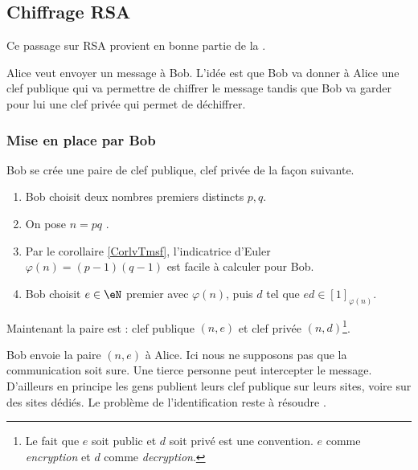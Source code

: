 \subsection{Chiffrage RSA}
\label{subSecEVaFYi}

Ce passage sur RSA provient en bonne partie de la .

Alice veut envoyer un message à Bob. L'idée est que Bob va donner à Alice une clef publique qui va permettre de chiffrer le message tandis que Bob va garder pour lui une clef privée qui permet de déchiffrer.

\subsubsection{Mise en place par Bob}

Bob se crée une paire de clef publique, clef privée de la façon suivante.
\begin{enumerate}
    \item
        Bob choisit deux nombres premiers distincts \( p,q\).
    \item
        On pose \( n=pq\) .
    \item
        Par le corollaire \ref{CorlvTmsf}, l'indicatrice d'Euler \( \varphi(n)=(p-1)(q-1)\) est facile à calculer pour Bob.
    \item
        Bob choisit \( e\in \eN\) premier avec \( \varphi(n)\), puis \( d\) tel que \( ed\in[1]_{\varphi(n)}\).
\end{enumerate}
Maintenant la paire est : clef publique \( (n,e)\) et clef privée \( (n,d)\)\footnote{Le fait que \( e\) soit public et \( d\) soit privé est une convention. \( e\) comme  \emph{encryption} et \( d\) comme \emph{decryption}.}.

Bob envoie la paire \( (n,e)\) à Alice. Ici nous ne supposons pas que la communication soit sure. Une tierce personne peut intercepter le message. D'ailleurs en principe les gens publient leurs clef publique sur leurs sites, voire sur des sites dédiés. Le problème de l'identification reste à résoudre .

